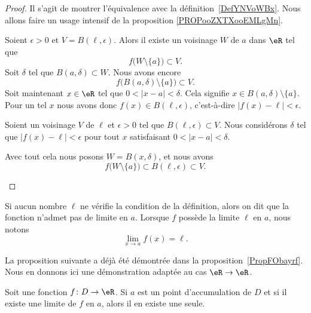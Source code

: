 \begin{proof}
	Il s'agit de montrer l'équivalence avec la définition~\ref{DefYNVoWBx}. Nous allons faire un usage intensif de la proposition \ref{PROPooZXTXooEMLgMn}.
	\begin{subproof}
		Soient \( \epsilon>0\) et \( V=B(\ell,\epsilon)\). Alors il existe un voisinage \( W\) de \( a\) dans \( \eR\) tel que
		\begin{equation}
			f\big( W\setminus\{ a \} \big)\subset V.
		\end{equation}
		Soit \( \delta\) tel que \( B(a,\delta)\subset W\). Nous avons encore
		\begin{equation}
			f\big( B(a,\delta)\setminus\{ a \} \big)\subset V.
		\end{equation}
		Soit maintenant \( x\in \eR\) tel que \( 0<| x-a |<\delta\). Cela signifie \( x\in B(a,\delta)\setminus\{ a \}\). Pour un tel \( x\) nous avons donc \( f(x)\in B(\ell,\epsilon)\), c'est-à-dire \( | f(x)-\ell |<\epsilon\).

		Soient un voisinage \( V\) de \( \ell\) et \( \epsilon>0\) tel que \( B(\ell,\epsilon)\subset V\). Nous considérons \( \delta\) tel que \( | f(x)-\ell |<\epsilon\) pour tout \( x\) satisfaisant \( 0<| x-a |<\delta\).

		Avec tout cela nous posons \( W=B(x,\delta)\), et nous avons
		\begin{equation}
			f\big( W\setminus\{ a \} \big)\subset B(\ell,\epsilon)\subset V.
		\end{equation}
	\end{subproof}
\end{proof}

Si aucun nombre \( \ell\) ne vérifie la condition de la définition, alors on dit que la fonction n'admet pas de limite en \( a\). Lorsque \( f\) possède la limite \( \ell\) en \( a\), nous notons
\begin{equation}
	\lim_{x\to a} f(x)=\ell.
\end{equation}

La proposition suivante a déjà été démontrée dans la proposition~\ref{PropFObayrf}. Nous en donnons ici une démonstration adaptée au cas \( \eR\to \eR\).

\begin{proposition}
	Soit une fonction \( f\colon D\to \eR\). Si \( a\) est un point d'accumulation de \( D\) et si il existe une limite de \( f\) en \( a\), alors il en existe une seule.
\end{proposition}

